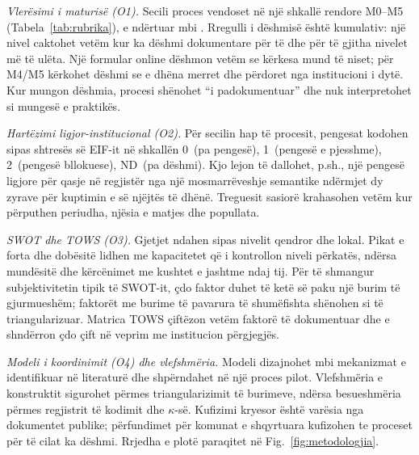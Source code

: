 \documentclass[conference]{IEEEtran}
\begin{document}
\textit{Vlerësimi i maturisë (O1).} Secili proces vendoset në një shkallë
rendore M0--M5 (Tabela~\ref{tab:rubrika}), e ndërtuar mbi
\cite{layne2001,scholta2019}. Rregulli i dëshmisë është kumulativ: një nivel
caktohet vetëm kur ka dëshmi dokumentare për të dhe për të gjitha nivelet
më të ulëta. Një formular online dëshmon vetëm se kërkesa mund të niset; për
M4/M5 kërkohet dëshmi se e dhëna merret dhe përdoret nga institucioni i dytë.
Kur mungon dëshmia, procesi shënohet ``i padokumentuar'' dhe nuk
interpretohet si mungesë e praktikës.

\textit{Hartëzimi ligjor-institucional (O2).} Për secilin hap të procesit,
pengesat kodohen sipas shtresës së EIF-it \cite{eif2017,campmas2022} në shkallën
0~(pa pengesë), 1~(pengesë e pjesshme), 2~(pengesë bllokuese), ND~(pa
dëshmi). Kjo lejon të dallohet, p.sh., një pengesë ligjore për qasje në
regjistër nga një mosmarrëveshje semantike ndërmjet dy zyrave për kuptimin e
së njëjtës të dhënë. Treguesit sasiorë krahasohen vetëm kur përputhen
periudha, njësia e matjes dhe popullata.

\textit{SWOT dhe TOWS (O3).} Gjetjet ndahen sipas nivelit qendror dhe lokal.
Pikat e forta dhe dobësitë lidhen me kapacitetet që i kontrollon niveli
përkatës, ndërsa mundësitë dhe kërcënimet me kushtet e jashtme ndaj tij. Për
të shmangur subjektivitetin tipik të SWOT-it, çdo faktor duhet të ketë së
paku një burim të gjurmueshëm; faktorët me burime të pavarura të shumëfishta
shënohen si të triangularizuar. Matrica TOWS \cite{weihrich1982} çiftëzon
vetëm faktorë të dokumentuar dhe e shndërron çdo çift në veprim me
institucion përgjegjës.

\textit{Modeli i koordinimit (O4) dhe vlefshmëria.} Modeli dizajnohet mbi
mekanizmat e identifikuar në literaturë \cite{wouters2023,fusi2021} dhe
shpërndahet në një proces pilot. Vlefshmëria e konstruktit sigurohet përmes
triangularizimit të burimeve, ndërsa besueshmëria përmes regjistrit të
kodimit dhe $\kappa$-së. Kufizimi kryesor është varësia nga dokumentet
publike; përfundimet për komunat e shqyrtuara kufizohen te proceset për të
cilat ka dëshmi. Rrjedha e plotë paraqitet në Fig.~\ref{fig:metodologjia}.
\end{document}
